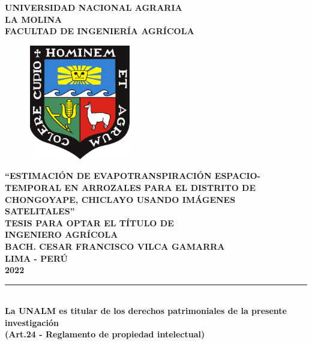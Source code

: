 \begin{titlepage}
    \centering
     {\fontsize{18pt}{ \baselineskip}\selectfont \textbf{UNIVERSIDAD NACIONAL AGRARIA}}
     \\[0.25cm]
     {\fontsize{18pt}{ \baselineskip}\selectfont \textbf{LA MOLINA}}
     \\[0.25cm]
     {\fontsize{16pt}{ \baselineskip}\selectfont \textbf{FACULTAD DE INGENIERÍA AGRÍCOLA}}
     \\[1cm]
     
    \begin{figure}[htb]
        \centering
        \includegraphics[width=4.5cm, height=5cm]{Cover/Escudo_UNALM.pdf}
    \end{figure}
    
    \vspace{0.5cm}
    
    {\fontsize{14pt}{ \baselineskip}\selectfont \textbf{``ESTIMACIÓN DE EVAPOTRANSPIRACIÓN ESPACIO-TEMPORAL EN ARROZALES PARA EL DISTRITO DE CHONGOYAPE, CHICLAYO USANDO IMÁGENES SATELITALES''}}
    \\[1cm]
    {\fontsize{14pt}{ \baselineskip}\selectfont \textbf{TESIS PARA OPTAR EL TÍTULO DE}}
    \\
    {\fontsize{14pt}{ \baselineskip}\selectfont \textbf{INGENIERO AGRÍCOLA}}
    \\[1cm]
    {\fontsize{14pt}{ \baselineskip}\selectfont \textbf{BACH. CESAR FRANCISCO VILCA GAMARRA}}\\[1cm]
    
    {\fontsize{14pt}{ \baselineskip}\selectfont \textbf{LIMA - PERÚ}}\\[0.5cm]
    {\fontsize{14pt}{ \baselineskip}\selectfont \textbf{2022}}
    
    \vfill %
    \singlespacing
    
    \rule{132mm}{0.25mm}\\
    {\small \textbf{La UNALM es titular de los derechos patrimoniales de la presente investigación\\ (Art.24 - Reglamento de propiedad intelectual)}}

\end{titlepage}
\restoregeometry
